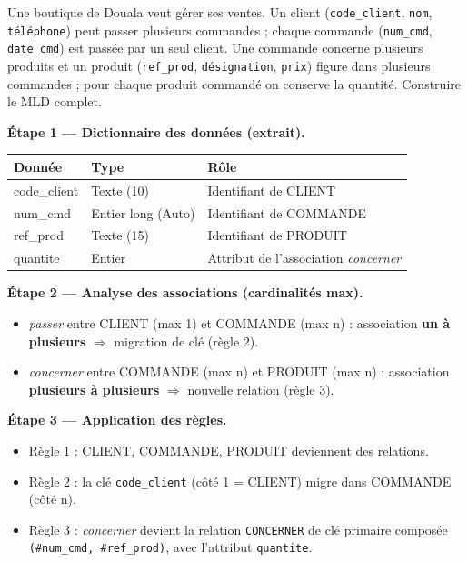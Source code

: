 \documentclass[11pt]{article}
\begin{document}
\begin{exoresolu}
Une boutique de Douala veut gérer ses ventes. Un client (\texttt{code\_client}, \texttt{nom}, \texttt{téléphone}) peut passer plusieurs commandes ; chaque commande (\texttt{num\_cmd}, \texttt{date\_cmd}) est passée par un seul client. Une commande concerne plusieurs produits et un produit (\texttt{ref\_prod}, \texttt{désignation}, \texttt{prix}) figure dans plusieurs commandes ; pour chaque produit commandé on conserve la quantité. Construire le MLD complet.

\tcblower
\textbf{Étape 1 — Dictionnaire des données (extrait).}
\begin{center}
\begin{tabularx}{\linewidth}{|l|l|X|}
\hline
\rowcolor{popblueL} \textbf{Donnée} & \textbf{Type} & \textbf{Rôle} \\
\hline
code\_client & Texte (10) & Identifiant de CLIENT \\
\hline
num\_cmd & Entier long (Auto) & Identifiant de COMMANDE \\
\hline
ref\_prod & Texte (15) & Identifiant de PRODUIT \\
\hline
quantite & Entier & Attribut de l'association \emph{concerner} \\
\hline
\end{tabularx}
\end{center}

\textbf{Étape 2 — Analyse des associations (cardinalités max).}
\begin{itemize}
\item \emph{passer} entre CLIENT (max 1) et COMMANDE (max n) : association \textbf{un à plusieurs} $\Rightarrow$ migration de clé (règle 2).
\item \emph{concerner} entre COMMANDE (max n) et PRODUIT (max n) : association \textbf{plusieurs à plusieurs} $\Rightarrow$ nouvelle relation (règle 3).
\end{itemize}

\textbf{Étape 3 — Application des règles.}
\begin{itemize}
\item Règle 1 : CLIENT, COMMANDE, PRODUIT deviennent des relations.
\item Règle 2 : la clé \texttt{code\_client} (côté 1 = CLIENT) migre dans COMMANDE (côté n).
\item Règle 3 : \emph{concerner} devient la relation \texttt{CONCERNER} de clé primaire composée \texttt{(\#num\_cmd, \#ref\_prod)}, avec l'attribut \texttt{quantite}.
\end{itemize}


\end{exoresolu}
\end{document}
